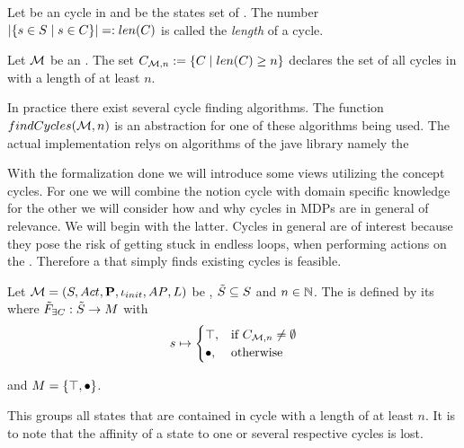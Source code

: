 \documentclass[preview]{standalone}
\begin{document}
\begin{definition}
	Let \cycle be an cycle in \chgph and \states be the states set of \chgph. The number $|\{{s} \in {S} \mid {s} \in {C}\}| =: {len}({C})$ is called the \emph{length} of a cycle. 
\end{definition}

\begin{definition}
	Let ${{{\mathcal{M}}}}$ be an \chgphN. The set ${{C}_{{{\mathcal{M}}}, n}} := \{ {C} \mid {len}({C}) \geq n\}$ declares the set of all cycles in \chgph with a length of at least $n$.
\end{definition}

In practice there exist several cycle finding algorithms. The function ${findCycles}({{{\mathcal{M}}}}, n)$ is an abstraction for one of these algorithms being used. The actual implementation relys on algorithms of the jave library \jgrapht namely the 

With the formalization done we will introduce some views utilizing the concept cycles. For one we will combine the notion cycle with domain specific knowledge for the other we will consider how and why cycles in MDPs are in general of relevance. We will begin with the latter.  Cycles in general are of interest because they pose the risk of getting stuck in endless loops, when performing actions on the \mdpN.  Therefore a \viewN that simply finds existing cycles is feasible.


\begin{definition}
	Let ${{{\mathcal{M}}}} = {{({S}, {Act}, {\textbf{P}}, {\iota_{init}}, {AP}, {L})}}$ be \achgphN, ${\tilde{{S}}} \subseteq {S}$ and $n \in {\mathbb{N}}$. The \viewN \viewhascycle is defined by its \grpfctN where ${{\tilde{F}_{{\exists{C}}}}} : {\tilde{{S}}} \to {\ensuremath{{M}}}$ with
	\[
	\state \mapsto
	\begin{cases}
			\group, &\text{if } \cycleset \neq \emptyset \\
			\remelem, &\text{otherwise}
		\end{cases}
	\]
	
	and ${{M}} = \{{\top}, {\bullet}\}$.
\end{definition}

This \viewN groups all states that are contained in cycle with a length of at least $n$. It is to note that the affinity of a state to one or several respective cycles is lost.
\end{document}
